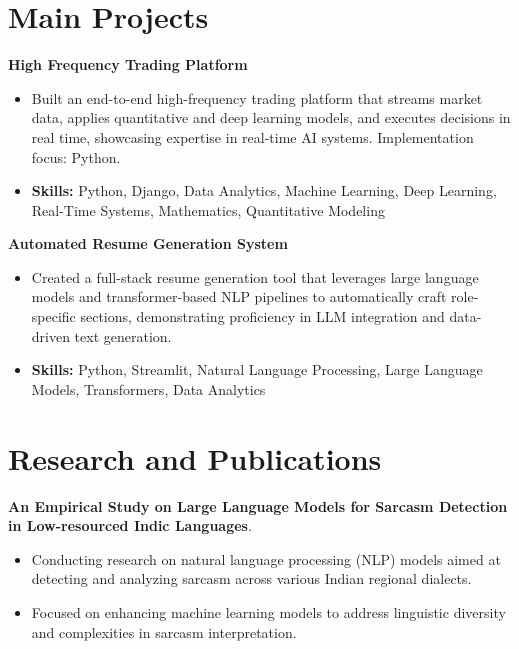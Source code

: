 \documentclass[a4paper,11pt]{article}
\begin{document}
\section{\textbf{Main Projects}}

\vspace{1mm}
  \textbf{High Frequency Trading Platform  }
\vspace{-1.5mm} %
\begin{itemize}
  \item Built an end-to-end high-frequency trading platform that streams market data, applies quantitative and deep learning models, and executes decisions in real time, showcasing expertise in real-time AI systems. Implementation focus: Python.
\vspace{-3mm}
  \item \textbf{Skills:} Python, Django, Data Analytics, Machine Learning, Deep Learning, Real-Time Systems, Mathematics, Quantitative Modeling
\end{itemize}


\vspace{1mm}
   \textbf{Automated Resume Generation System }
\vspace{-1.5mm} %
\begin{itemize}
  \item Created a full-stack resume generation tool that leverages large language models and transformer-based NLP pipelines to automatically craft role-specific sections, demonstrating proficiency in LLM integration and data-driven text generation.
\vspace{-3mm}
  \item \textbf{Skills:} Python, Streamlit, Natural Language Processing, Large Language Models, Transformers, Data Analytics
\end{itemize}



\section{\textbf{Research and Publications} \hfill }
\vspace{1mm}
  \textbf{An Empirical Study on Large Language Models for Sarcasm Detection in Low-resourced Indic Languages}.
\vspace{-1mm} %
\begin{itemize}
  \item Conducting research on natural language processing (NLP) models aimed at detecting and analyzing sarcasm across various Indian regional dialects.
\vspace{-3mm}
  \item Focused on enhancing machine learning models to address linguistic diversity and complexities in sarcasm interpretation.
\end{itemize}
\end{document}
